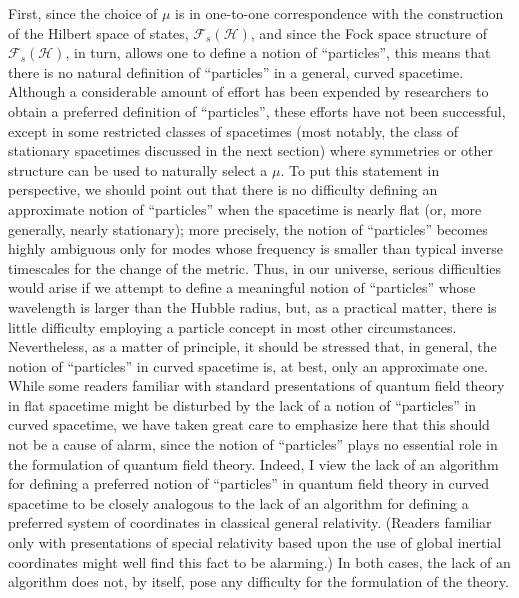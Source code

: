 \documentclass[11pt,a4paper]{article}
\begin{document}
First, since the choice of \(\mu\) is in one-to-one correspondence with the construction of the Hilbert space of states, \(\mathcal{F}_s(\mathcal{H})\), and since the Fock space structure of \(\mathcal{F}_s(\mathcal{H})\), in turn, allows one to define a notion of ``particles'', this means that there is no natural definition of ``particles'' in a general, curved spacetime. Although a considerable amount of effort has been expended by researchers to obtain a preferred definition of ``particles'', these efforts have not been successful, except in some restricted classes of spacetimes (most notably, the class of stationary spacetimes discussed in the next section) where symmetries or other structure can be used to naturally select a \(\mu\). To put this statement in perspective, we should point out that there is no difficulty defining an approximate notion of ``particles'' when the spacetime is nearly flat (or, more generally, nearly stationary); more precisely, the notion of ``particles'' becomes highly ambiguous only for modes whose frequency is smaller than typical inverse timescales for the change of the metric. Thus, in our universe, serious difficulties would arise if we attempt to define a meaningful notion of ``particles'' whose wavelength is larger than the Hubble radius, but, as a practical matter, there is little difficulty employing a particle concept in most other circumstances. Nevertheless, as a matter of principle, it should be stressed that, in general, the notion of ``particles'' in curved spacetime is, at best, only an approximate one. While some readers familiar with standard presentations of quantum field theory in flat spacetime might be disturbed by the lack of a notion of ``particles'' in curved spacetime, we have taken great care to \hypertarget{source-73}{}emphasize here that this should not be a cause of alarm, since the notion of ``particles'' plays no essential role in the formulation of quantum field theory. Indeed, I view the lack of an algorithm for defining a preferred notion of ``particles'' in quantum field theory in curved spacetime to be closely analogous to the lack of an algorithm for defining a preferred system of coordinates in classical general relativity. (Readers familiar only with presentations of special relativity based upon the use of global inertial coordinates might well find this fact to be alarming.) In both cases, the lack of an algorithm does not, by itself, pose any difficulty for the formulation of the theory.
\end{document}
